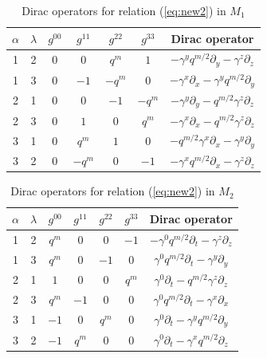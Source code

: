 \documentclass[12pt,a4paper]{article}
\theoremstyle{plain}
\theoremstyle{definition}
\begin{document}
\begin{table}[H]
\centering
\small
\caption{Dirac operators for relation (\ref{eq:new2}) in $M_1$}
\label{tab:app-dirac-new2-m1}
\begin{tabular}{|c|c|c|c|c|c|c|}
\hline
$\alpha$ & $\lambda$ & $g^{00}$ & $g^{11}$ & $g^{22}$ & $g^{33}$ & Dirac operator \\
\hline
1 & 2 & $0$ & $0$ & $q^{m}$ & $1$ & $-\gamma^{y} q^{m/2}\partial_y - \gamma^{z}\partial_z$ \\
\hline
1 & 3 & $0$ & $-1$ & $-q^{m}$ & $0$ & $-\gamma^{x}\partial_x - \gamma^{y} q^{m/2}\partial_y$ \\
\hline
2 & 1 & $0$ & $0$ & $-1$ & $-q^{m}$ & $-\gamma^{y}\partial_y - q^{m/2}\gamma^{z}\partial_z$ \\
\hline
2 & 3 & $0$ & $1$ & $0$ & $q^{m}$ & $-\gamma^{x}\partial_x - q^{m/2}\gamma^{z}\partial_z$ \\
\hline
3 & 1 & $0$ & $q^{m}$ & $1$ & $0$ & $-q^{m/2}\gamma^{x}\partial_x - \gamma^{y}\partial_y$ \\
\hline
3 & 2 & $0$ & $-q^{m}$ & $0$ & $-1$ & $-\gamma^{x} q^{m/2}\partial_x - \gamma^{z}\partial_z$ \\
\hline
\end{tabular}
\end{table}

\begin{table}[H]
\centering
\small
\caption{Dirac operators for relation (\ref{eq:new2}) in $M_2$}
\label{tab:app-dirac-new2-m2}
\begin{tabular}{|c|c|c|c|c|c|c|}
\hline
$\alpha$ & $\lambda$ & $g^{00}$ & $g^{11}$ & $g^{22}$ & $g^{33}$ & Dirac operator \\
\hline
1 & 2 & $q^{m}$ & $0$ & $0$ & $-1$ & $-\gamma^{0} q^{m/2}\partial_t - \gamma^{z}\partial_z$ \\
\hline
1 & 3 & $q^{m}$ & $0$ & $-1$ & $0$ & $\gamma^{0} q^{m/2}\partial_t - \gamma^{y}\partial_y$ \\
\hline
2 & 1 & $1$ & $0$ & $0$ & $q^{m}$ & $\gamma^{0}\partial_t - q^{m/2}\gamma^{z}\partial_z$ \\
\hline
2 & 3 & $q^{m}$ & $-1$ & $0$ & $0$ & $\gamma^{0} q^{m/2}\partial_t - \gamma^{x}\partial_x$ \\
\hline
3 & 1 & $-1$ & $0$ & $q^{m}$ & $0$ & $\gamma^{0}\partial_t - \gamma^{y} q^{m/2}\partial_y$ \\
\hline
3 & 2 & $-1$ & $q^{m}$ & $0$ & $0$ & $\gamma^{0}\partial_t - \gamma^{x} q^{m/2}\partial_z$ \\
\hline
\end{tabular}
\end{table}
\end{document}
